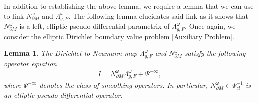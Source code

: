 \documentclass[12pt,a4paper]{amsart}
\numberwithin{equation}{section}
\theoremstyle{plain}
\newtheorem{lemma}[theorem]{Lemma}
\theoremstyle{definition}
\begin{document}
In addition to establishing the above lemma, we require a lemma that we can use to link $N^\omega_{\partial M}$ and $\Lambda^\omega_{g,F}$. The following lemma elucidates said link as it shows that $N^\omega_{\partial M}$ is a left, elliptic pseudo-differential parametrix of $\Lambda^\omega_{g,F}$. Once again, we consider the elliptic Dirichlet boundary value problem \eqref{Auxiliary Problem}. 
    \begin{lemma}\label{Parametrix lemma}
        The Dirichlet-to-Neumann map $\Lambda^\omega_{g,F}$ and $N^\omega_{\partial M}$ satisfy the following operator equation
		\begin{align}\label{Operator Form Eq}
			I = N^\omega_{\partial M} \Lambda^\omega_{g,F} +\Psi^{-\infty},
		\end{align}
        where $\Psi^{-\infty}$ denotes the class of smoothing operators. In particular,  $N^\omega_{\partial M} \in \Psi^{-1}_{cl}$ is an elliptic pseudo-differential operator. 
    \end{lemma}
\end{document}

